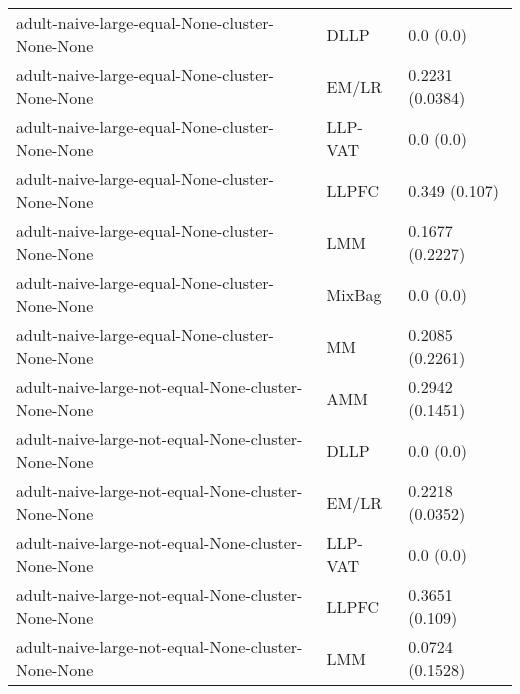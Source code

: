 \begin{longtable}{lll}
                                                               adult-naive-large-equal-None-cluster-None-None &      DLLP &                             0.0 (0.0) \\
                                                               adult-naive-large-equal-None-cluster-None-None &     EM/LR &                       0.2231 (0.0384) \\
                                                               adult-naive-large-equal-None-cluster-None-None &   LLP-VAT &                             0.0 (0.0) \\
                                                               adult-naive-large-equal-None-cluster-None-None &     LLPFC &                         0.349 (0.107) \\
                                                               adult-naive-large-equal-None-cluster-None-None &       LMM &                       0.1677 (0.2227) \\
                                                               adult-naive-large-equal-None-cluster-None-None &    MixBag &                             0.0 (0.0) \\
                                                               adult-naive-large-equal-None-cluster-None-None &        MM &                       0.2085 (0.2261) \\
                                                           adult-naive-large-not-equal-None-cluster-None-None &       AMM &                       0.2942 (0.1451) \\
                                                           adult-naive-large-not-equal-None-cluster-None-None &      DLLP &                             0.0 (0.0) \\
                                                           adult-naive-large-not-equal-None-cluster-None-None &     EM/LR &                       0.2218 (0.0352) \\
                                                           adult-naive-large-not-equal-None-cluster-None-None &   LLP-VAT &                             0.0 (0.0) \\
                                                           adult-naive-large-not-equal-None-cluster-None-None &     LLPFC &                        0.3651 (0.109) \\
                                                           adult-naive-large-not-equal-None-cluster-None-None &       LMM &                       0.0724 (0.1528) \\

\end{longtable}
